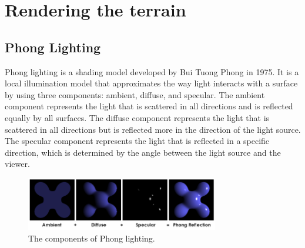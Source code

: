 \documentclass{article}
\begin{document}
\section{Rendering the terrain}
\label{ch:rendering-the-terrain}
\subsection{Phong Lighting}

Phong lighting is a shading model developed by Bui Tuong Phong in 1975. It is a local illumination
model that approximates the way light interacts with a surface by using three components: ambient,
diffuse, and specular. The ambient component represents the light that is scattered in all
directions and is reflected equally by all surfaces. The diffuse component represents the light
that is scattered in all directions but is reflected more in the direction of the light source. The
specular component represents the light that is reflected in a specific direction, which is
determined by the angle between the light source and the viewer.

\begin{figure}[H]
	\centering
	\includegraphics[width=0.75\textwidth]{img/phong.png}
	\caption{The components of Phong lighting.}
	\label{fig:phong}
\end{figure}

\end{document}
